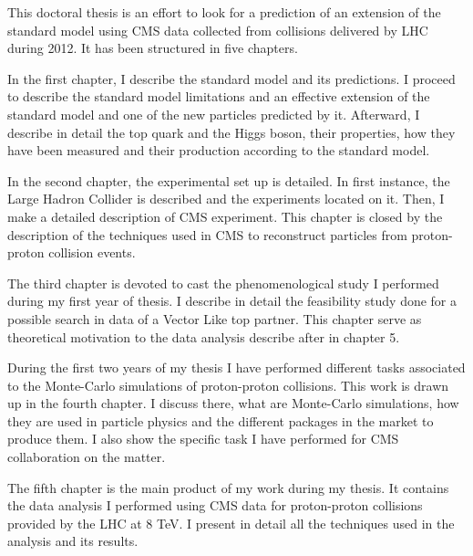 This doctoral thesis is an effort to look for a prediction of an extension of the standard model using CMS data collected from collisions delivered by LHC during 2012. It has been structured in five chapters.

In the first chapter, I describe the standard model and its predictions. I proceed to describe the standard model limitations and an effective extension of the standard model and one of the new particles predicted by it. Afterward, I describe in detail the top quark and the Higgs boson, their properties, how they have been measured and their production according to the standard model.

In the second chapter, the experimental set up is detailed. In first instance, the Large Hadron Collider is described and the experiments located on it. Then, I make a detailed description of CMS experiment. This chapter is closed by the description of the techniques used in CMS to reconstruct particles from proton-proton collision events. 

The third chapter is devoted to cast the phenomenological study I performed during my first year of thesis. I describe in detail the feasibility study done for a possible search in data of a Vector Like top partner. This chapter serve as theoretical motivation to the data analysis describe after in chapter 5.

During the first two years of my thesis I have performed different tasks associated to the Monte-Carlo simulations of proton-proton collisions. This work is drawn up in the fourth chapter. I discuss there, what are Monte-Carlo simulations, how they are used in particle physics and the different packages in the market to produce them. I also show the specific task I have performed for CMS collaboration on the matter.

The fifth chapter is the main product of my work during my thesis. It contains the data analysis I performed using CMS data for proton-proton collisions provided by the LHC at 8 TeV. I present in detail all the techniques used in the analysis and its results.